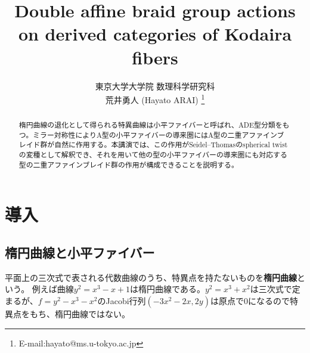 \documentclass[uplatex,11pt,a4paper,dvipdfmx]{jsarticle}
\title{Double affine braid group actions on derived categories of Kodaira fibers}    %
\author{東京大学大学院 数理科学研究科 \\
荒井勇人 (Hayato ARAI) 
\footnote{E-mail:hayato@ms.u-tokyo.ac.jp}}
\date{}    %
\numberwithin{equation}{section}
\theoremstyle{definition}
\begin{document}
\maketitle

\begin{abstract}   %
    楕円曲線の退化として得られる特異曲線は小平ファイバーと呼ばれ、ADE型分類をもつ。ミラー対称性によりA型の小平ファイバーの導来圏にはA型の二重アファインブレイド群が自然に作用する。本講演では、この作用がSeidel--Thomasのspherical twistの変種として解釈でき、それを用いて他の型の小平ファイバーの導来圏にも対応する型の二重アファインブレイド群の作用が構成できることを説明する。
\end{abstract}


\section{導入}
\subsection{楕円曲線と小平ファイバー}

平面上の三次式で表される代数曲線のうち、特異点を持たないものを\textbf{楕円曲線}という。
例えば曲線$y^2 = x^3 - x + 1$は楕円曲線である。$y^2 = x^3 + x^2$は三次式で定まるが、$f = y^2-x^3 - x^2$のJacobi行列$(-3x^2-2x, 2y)$は原点で$0$になるので特異点をもち、楕円曲線ではない。
\end{document}
